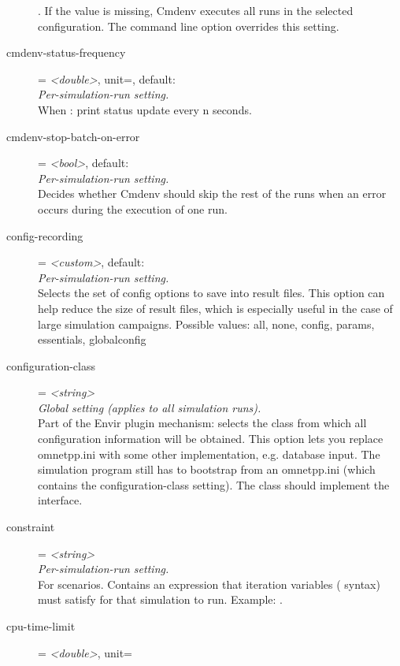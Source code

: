 \begin{description}
    . If
    the value is missing, Cmdenv executes all runs in the selected
    configuration. The  command line option overrides this
    setting.
\item[cmdenv-status-frequency] = \textit{<double>}, unit=, default: \\
    \textit{Per-simulation-run setting.}\\
    When :
    print status update every n seconds.
\item[cmdenv-stop-batch-on-error] = \textit{<bool>}, default: \\
    \textit{Per-simulation-run setting.}\\
    Decides whether Cmdenv should skip the rest of the runs when an error
    occurs during the execution of one run.
\item[config-recording] = \textit{<custom>}, default: \\
    \textit{Per-simulation-run setting.}\\
    Selects the set of config options to save into result files. This option
    can help reduce the size of result files, which is especially useful in the
    case of large simulation campaigns. Possible values: all, none, config,
    params, essentials, globalconfig
\item[configuration-class] = \textit{<string>}\\
    \textit{Global setting (applies to all simulation runs).}\\
    Part of the Envir plugin mechanism: selects the class from which all
    configuration information will be obtained. This option lets you replace
    omnetpp.ini with some other implementation, e.g. database input. The
    simulation program still has to bootstrap from an omnetpp.ini (which
    contains the configuration-class setting). The class should implement the
     interface.
\item[constraint] = \textit{<string>}\\
    \textit{Per-simulation-run setting.}\\
    For scenarios. Contains an expression that iteration variables
    (\ttt{\$\{{\allowbreak}\}{\allowbreak}} syntax) must satisfy for that
    simulation to run. Example: .
\item[cpu-time-limit] = \textit{<double>}, unit=\\

\end{description}
